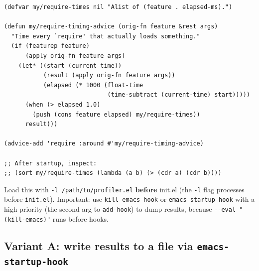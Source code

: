 \begin{verbatim}
(defvar my/require-times nil "Alist of (feature . elapsed-ms).")

(defun my/require-timing-advice (orig-fn feature &rest args)
  "Time every `require' that actually loads something."
  (if (featurep feature)
      (apply orig-fn feature args)
    (let* ((start (current-time))
           (result (apply orig-fn feature args))
           (elapsed (* 1000 (float-time
                             (time-subtract (current-time) start)))))
      (when (> elapsed 1.0)
        (push (cons feature elapsed) my/require-times))
      result)))

(advice-add 'require :around #'my/require-timing-advice)

;; After startup, inspect:
;; (sort my/require-times (lambda (a b) (> (cdr a) (cdr b))))
\end{verbatim}

Load this with \texttt{-l /path/to/profiler.el} \textbf{before} init.el (the \texttt{-l} flag processes before \texttt{init.el}). Important: use \texttt{kill-emacs-hook} or \texttt{emacs-startup-hook} with a high priority (the second arg to \texttt{add-hook}) to dump results, because \texttt{-\/-eval "(kill-emacs)"} runs before hooks.

\subsection{Variant A: write results to a file via \texttt{emacs-startup-hook}}\label{variant-a-write-results-to-a-file-via-emacs-startup-hook}

